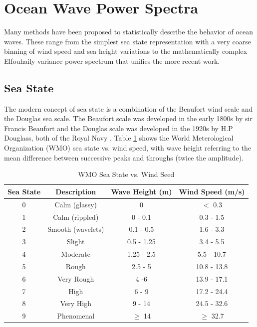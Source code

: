 \section{Ocean Wave Power Spectra}  \label{os_sec:power_spectra}
Many methods have been proposed to statistically describe the behavior of ocean waves. These range from the simplest sea state representation with a very coarse binning of wind speed and sea height variations to the mathematically complex Elfouhaily variance power spectrum that unifies the more recent work.

\subsection {Sea State}
The modern concept of sea state is a combination of the Beaufort wind scale and the Douglas sea scale. The Beaufort scale was developed in the early 1800s by sir Francis Beaufort and the Douglas scale was developed in the 1920s by H.P Douglass, both of the Royal Navy \cite{uk_met_fact_sheet6}. Table \ref{os_tab:0} shows the World Meterological Organization (WMO) sea state vs. wind speed, with wave height referring to the mean difference between successive peaks and throughs (twice the amplitude).

\begin{table}[H]
\begin{center}
  \begin{tabular} {|c | c | c| c|}
    \hline
  \bf{Sea State} & \bf{Descriptio}n & \bf{Wave Height (m)} & \bf{Wind Speed (m/s)}\\ \hline
  0 & Calm (glassy) & 0 & $<$ 0.3 \\ \hline
  1 & Calm (rippled) & 0 - 0.1 & 0.3 - 1.5 \\ \hline
  2 & Smooth (wavelets) & 0.1 - 0.5 & 1.6 - 3.3 \\ \hline
  3 & Slight & 0.5 - 1.25 & 3.4 - 5.5 \\ \hline
  4 & Moderate & 1.25 - 2.5 & 5.5 - 10.7 \\ \hline
  5 & Rough & 2.5 - 5 & 10.8 - 13.8 \\ \hline
  6 & Very Rough & 4 -6 & 13.9 - 17.1\\ \hline
  7 & High & 6 - 9 & 17.2 - 24.4\\ \hline
  8 & Very High & 9 - 14 & 24.5 - 32.6\\ \hline
  9 & Phenomenal & $\geq$ 14 & $\geq$ 32.7\\ \hline
\end{tabular}
  \renewcommand{\baselinestretch}{1} \small\normalsize
  \begin{quote}
    \caption[WMO Sea State vs. Wind Speed]{WMO Sea State vs. Wind Seed\label{os_tab:0}}
  \end{quote}
\end{center}
\end{table}
\renewcommand{\baselinestretch}{2} \small\normalsize

